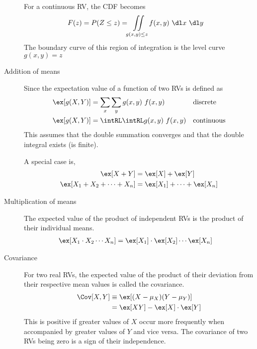 \begin{description}
          For a continuous RV, the CDF becomes
          \begin{align}
              F(z) & = P(Z \leq z) = \iint\limits_{g(x, y) \leq z} f(x, y)\ \dl x\ \dl y
          \end{align}
          The boundary curve of this region of integration is the level curve
          $ g(x,y) = z $

    \item[Addition of means] Since the expectation value of a function of two RVs is
          defined as
          \begin{align}
              \ex[g(X,Y)] & = \sum_x \sum_y g(x,y)\ f(x,y) &  & \text{discrete}   \\
              \ex[g(X,Y)] & = \intRL \intRL g(x,y)\ f(x,y) &  & \text{continuous}
          \end{align}
          This assumes that the double summation converges and that the double integral
          exists (is finite). \par
          A special case is,
          \begin{align}
              \ex[X+Y]                     & = \ex[X] + \ex[Y]             \\
              \ex[X_1 + X_2 + \dots + X_n] & = \ex[X_1] + \dots + \ex[X_n]
          \end{align}

    \item[Multiplication of means] The expected value of the product of independent
          RVs is the product of their individual means.
          \begin{align}
              \ex[X_1 \cdot X_2 \cdots X_n] & = \ex[X_1] \cdot \ex[X_2] \cdots \ex[X_n]
          \end{align}

    \item[Covariance] For two real RVs, the expected value of the product of their
          deviation from their respective mean values is called the covariance.
          \begin{align}
              \Cov[X,Y] & \equiv \ex[(X - \mu_X)(Y - \mu_Y)] \\
                        & = \ex[XY] - \ex[X] \cdot \ex[Y]
          \end{align}
          This is positive if greater values of $ X $ occur more frequently when
          accompanied by greater values of $ Y $ and vice versa. The covariance of
          two RVs being zero is a sign of their independence.


\end{description}
